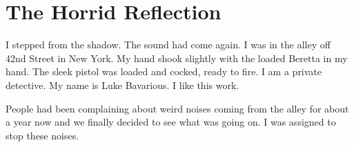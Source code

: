 \chapter{The Horrid Reflection}


I stepped from the shadow. The sound had come again. I was in the alley
off 42nd Street in New York. My hand shook slightly with the loaded
Beretta in my hand. The sleek pistol was loaded and cocked, ready to
fire. I am a private detective. My name is Luke Bavarious. I like this
work.

People had been complaining about weird noises coming from the alley for
about a year now and we finally decided to see what was going on. I was
assigned to stop these noises.

